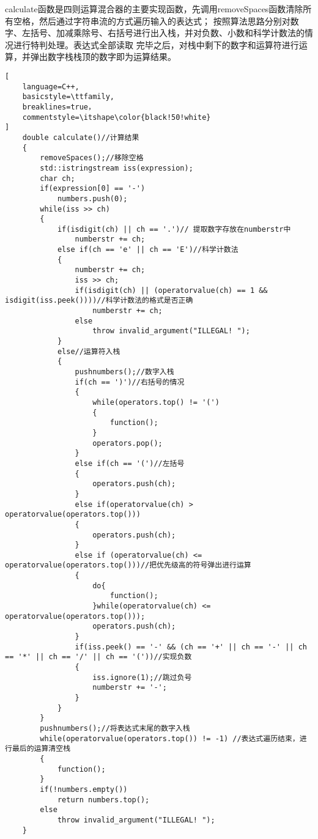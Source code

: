 \documentclass[UTF8]{ctexart}
\begin{document}
calculate函数是四则运算混合器的主要实现函数，先调用removeSpaces函数清除所有空格，然后通过字符串流的方式遍历输入的表达式；
按照算法思路分别对数字、左括号、加减乘除号、右括号进行出入栈，并对负数、小数和科学计数法的情况进行特判处理。表达式全部读取
完毕之后，对栈中剩下的数字和运算符进行运算，并弹出数字栈栈顶的数字即为运算结果。
\begin{lstlisting}[
    language=C++,
    basicstyle=\ttfamily,
    breaklines=true，
    commentstyle=\itshape\color{black!50!white}
]
    double calculate()//计算结果
    {
        removeSpaces();//移除空格
        std::istringstream iss(expression);
        char ch;
        if(expression[0] == '-')
            numbers.push(0);
        while(iss >> ch)
        {   
            if(isdigit(ch) || ch == '.')// 提取数字存放在numberstr中
                numberstr += ch;
            else if(ch == 'e' || ch == 'E')//科学计数法
            {
                numberstr += ch;
                iss >> ch;
                if(isdigit(ch) || (operatorvalue(ch) == 1 && isdigit(iss.peek())))//科学计数法的格式是否正确
                    numberstr += ch;
                else 
                    throw invalid_argument("ILLEGAL! ");
            }
            else//运算符入栈
            {   
                pushnumbers();//数字入栈
                if(ch == ')')//右括号的情况
                {   
                    while(operators.top() != '(')
                    {
                        function();
                    }
                    operators.pop();
                }
                else if(ch == '(')//左括号
                {
                    operators.push(ch);
                }
                else if(operatorvalue(ch) > operatorvalue(operators.top()))
                {
                    operators.push(ch);
                }
                else if (operatorvalue(ch) <= operatorvalue(operators.top()))//把优先级高的符号弹出进行运算
                {   
                    do{
                        function();
                    }while(operatorvalue(ch) <= operatorvalue(operators.top()));
                    operators.push(ch);
                }
                if(iss.peek() == '-' && (ch == '+' || ch == '-' || ch == '*' || ch == '/' || ch == '('))//实现负数
                {
                    iss.ignore(1);//跳过负号
                    numberstr += '-';
                }
            }
        }
        pushnumbers();//将表达式末尾的数字入栈
        while(operatorvalue(operators.top()) != -1) //表达式遍历结束，进行最后的运算清空栈
        {
            function();
        }
        if(!numbers.empty()) 
            return numbers.top();
        else
            throw invalid_argument("ILLEGAL! ");
    }
\end{lstlisting}
\end{document}
